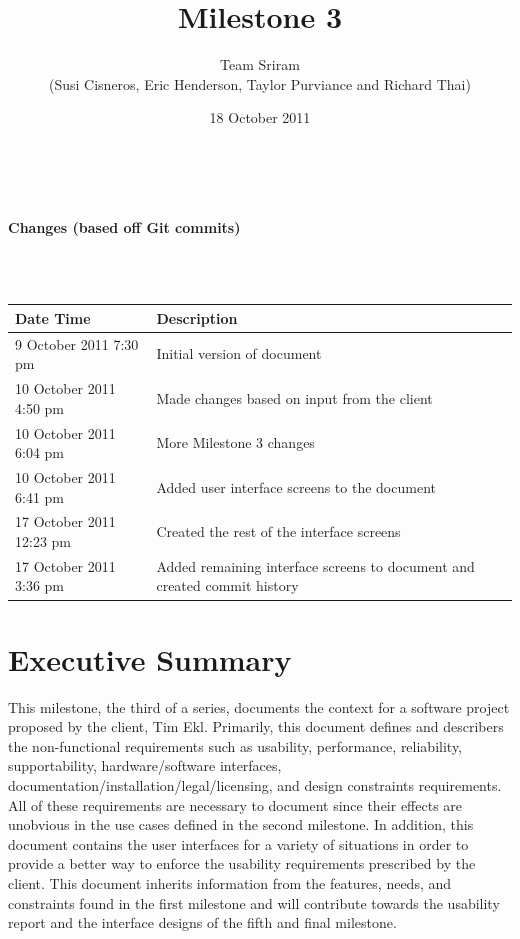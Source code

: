 \documentclass{article}
\begin{document}
\setlength{\voffset}{3.5in}
\title{Milestone 3}
\author{Team Sriram\\
(Susi Cisneros, Eric Henderson, Taylor Purviance and Richard Thai)}
\date{18 October 2011}
\maketitle
\clearpage
\setlength{\voffset}{0pt}
\tableofcontents
\clearpage
~\\
\begin{Large}\textbf{Changes (based off Git commits)}\end{Large}\\
~\\
\begin{tabular}{ | p{2in} | p{4.5in} | }
\hline
\textbf{Date Time} & \textbf{Description}\\
\hline
\hline
9 October 2011 7:30 pm & Initial version of document\\
\hline
10 October 2011 4:50 pm & Made changes based on input from the client\\
\hline
10 October 2011 6:04 pm & More Milestone 3 changes\\
\hline
10 October 2011 6:41 pm & Added user interface screens to the document\\
\hline
17 October 2011 12:23 pm & Created the rest of the interface screens\\
\hline
17 October 2011 3:36 pm & Added remaining interface screens to document and created commit history\\
\hline
\end{tabular}
\clearpage

\section{Executive Summary}
This milestone, the third of a series, documents the context for a software project proposed by the client, Tim Ekl.  Primarily, this document defines and describers the non-functional requirements such as usability, performance, reliability, supportability, hardware/software interfaces, documentation/installation/legal/licensing, and design constraints requirements.  All of  these requirements are necessary to document since their effects are unobvious in the use cases defined in the second milestone.  In addition, this document contains the user interfaces for a variety of situations in order to provide a better way to enforce the usability requirements prescribed by the client.  This document inherits information from the features, needs, and constraints found in the first milestone and will contribute towards the usability report and the interface designs of the fifth and final milestone.
\end{document}

